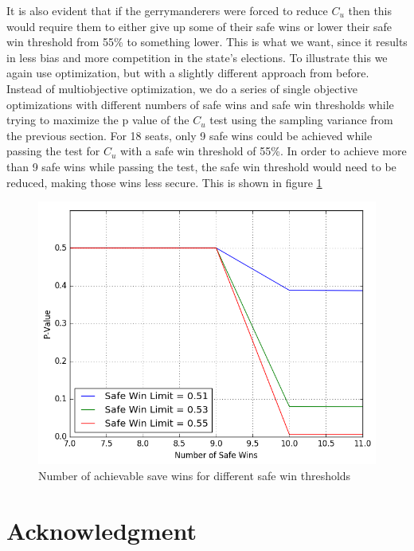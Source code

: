 \documentclass[preprint,12pt]{article}
\begin{document}
It is also evident that if the gerrymanderers were forced to reduce $C_{u}$ then this would require them to either give up some of their safe wins or lower their safe win threshold from 55\% to something lower.
This is what we want, since it results in less bias and more competition in the state's elections.
To illustrate this we again use optimization, but with a slightly different approach from before.
Instead of multiobjective optimization, we do a series of single objective optimizations with different numbers of safe wins and safe win thresholds while trying to maximize the p value of the $C_{u}$ test using the sampling variance from the previous section.
For 18 seats, only 9 safe wins could be achieved while passing the test for $C_{u}$ with a safe win threshold of 55\%.
In order to achieve more than 9 safe wins while passing the test, the safe win threshold would need to be reduced, making those wins less secure.
This is shown in figure \ref{fig:sw}

\begin{figure}[htb!]
    \begin{center}
        \includegraphics[scale=0.8]{../Figures/SimVsAsymptotic/gamingCu.png}
        \caption{Number of achievable save wins for different safe win thresholds}\label{fig:sw}
    \end{center}
\end{figure}
\section*{Acknowledgment}
\section*{}


\clearpage
\end{document}
